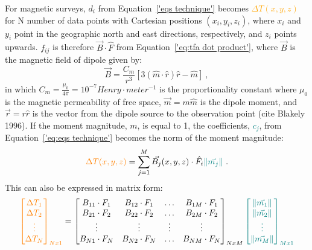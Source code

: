 For magnetic surveys, {$d_i$} from Equation~\ref{'eqs technique'} becomes \textcolor{orange}{$\Delta T(x, y, z)$} for N number of data points with Cartesian positions $(x_i, y_i, z_i)$, where $x_i$ and $y_i$ point in the geographic north and east directions, respectively, and $z_i$ points upwards. $f_{ij}$ is therefore $\vec{B} \cdot \hat{F}$ from Equation~\ref{'eq:tfa dot product'}, where $\vec{B}$ is the magnetic field of dipole given by:
\begin{equation}
    \vec{B} = \frac{C_m}{r^3} [3 ( \hat{m} \cdot \hat{r}) \hat{r} - \hat{m}]
    \ ,
\end{equation}
in which $C_m = \frac{\mu_0}{4 \pi} = 10^{-7} Henry \cdot meter^{-1}$ is the proportionality constant where $\mu_0$ is the magnetic permeability of free space, $ \vec{m} = m \hat{m}$ is the dipole moment, and $\vec{r} = r \hat{r} $ is the vector from the dipole source to the observation point (cite Blakely 1996). If the moment magnitude, $m$, is equal to 1, the coefficients, \textcolor{teal}{$c_j$}, from Equation~\ref{'eq:eqs technique'} becomes the norm of the moment magnitude:
\begin{equation}
\label{'eq:tfa_eqs'}
\textcolor{orange}{\Delta T (x, y, z)} = \sum_{j=1}^{M}  \vec{B_j}(x, y, z) \cdot \hat{F_i} \textcolor{teal}{\left\lVert \vec{m_j} \right\rVert}
\ .
\end{equation}
This can also be expressed in matrix form:
\begin{equation}
\textcolor{orange}{\begin{bmatrix}
    \Delta T_1 \\ \Delta T_2 \\ \vdots \\ \Delta T_N
\end{bmatrix}_{Nx1}} = \begin{bmatrix}
    B_{11} \cdot F_{1} & B_{12} \cdot F_{1} & \hdots & B_{1M} \cdot F_{1} \\
    B_{21} \cdot F_{2} & B_{22} \cdot F_{2} & \hdots & B_{2M} \cdot F_{2} \\
    \vdots & \vdots & \vdots & \vdots \\
    B_{N1} \cdot F_{N} & B_{N2} \cdot F_{N} & \hdots & B_{NM} \cdot F_{N} \\
\end{bmatrix}_{NxM} \textcolor{teal}{\begin{bmatrix}
    \left\lVert \vec{m_1} \right\rVert \\ \left\lVert \vec{m_2} \right\rVert \\ \vdots \\ \left\lVert \vec{m_M} \right\rVert
\end{bmatrix}_{Mx1}}
\end{equation}
